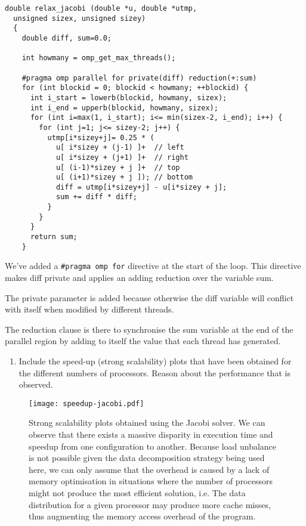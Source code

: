 \documentclass{report}
\begin{document}
\begin{lstlisting}[style=C2]
double relax_jacobi (double *u, double *utmp,
  unsigned sizex, unsigned sizey)
  {
    double diff, sum=0.0;

    int howmany = omp_get_max_threads();

    #pragma omp parallel for private(diff) reduction(+:sum)
    for (int blockid = 0; blockid < howmany; ++blockid) {
      int i_start = lowerb(blockid, howmany, sizex);
      int i_end = upperb(blockid, howmany, sizex);
      for (int i=max(1, i_start); i<= min(sizex-2, i_end); i++) {
        for (int j=1; j<= sizey-2; j++) {
          utmp[i*sizey+j]= 0.25 * (
            u[ i*sizey + (j-1) ]+  // left
            u[ i*sizey + (j+1) ]+  // right
            u[ (i-1)*sizey + j ]+  // top
            u[ (i+1)*sizey + j ]); // bottom
            diff = utmp[i*sizey+j] - u[i*sizey + j];
            sum += diff * diff;
          }
        }
      }
      return sum;
    }
\end{lstlisting}
\vspace{1cm}

We've added a \texttt{\#pragma omp for} directive at the start of the loop. This directive makes diff private and applies an adding reduction over the variable sum.

The private parameter is added because otherwise the diff variable will conflict with itself when modified by different threads.

The reduction clause is there to synchronise the sum variable at the end of the parallel region by adding to itself the value that each thread has generated.

\begin{enumerate}[resume]
  \item Include the speed-up (strong scalability) plots that have been obtained for the different numbers of processors. Reason about the performance that is observed.
\end{enumerate}


\begin{SCfigure}[][ht]
  \caption
  {
  Strong scalability plots obtained using the Jacobi solver. \break We can observe that there exists a massive disparity in execution time and speedup from one configuration to another. Because load unbalance is not possible given the data decomposition strategy being used here, we can only assume that the overhead is caused by a lack of memory optimisation in situations where the number of processors might not produce the most efficient solution, i.e. The data distribution for a given processor may produce more cache misses, thus augmenting the memory access overhead of the program.
  }
  \hspace*{-5cm}
  \texttt{[image: speedup-jacobi.pdf]}
\end{SCfigure}
\end{document}
